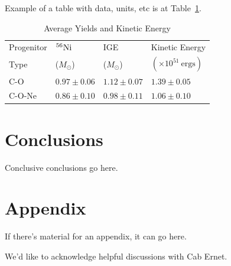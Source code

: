 \documentclass[iop,apj]{emulateapj}
\newcommand{\tabref}[1]{Table~\ref{#1}}
\newcommand{\Ni}[1]{\ensuremath{{}^{#1}{\rm Ni}}}
\newcommand{\unitstyle}[1]{\ensuremath{\mathrm{#1}}}
\newcommand{\erg}{\unitstyle{ergs}} %
\newcommand{\Msun}{\ensuremath{M_\odot}}
\begin{document}
Example of a table with data, units, etc is at \tabref{YieldSummaryTable}.

\begin{table}[htbp]
  \caption{Average Yields and Kinetic Energy}
  \begin{center}
    \begin{tabular}{llll}
      \vspace{-0.75cm} \\ \hline \hline
      Progenitor & \Ni{56} & IGE & Kinetic Energy \\
      Type & (\Msun) & (\Msun) & $\left(\times 10^{51} ~\erg\right)$ \\ \hline
      C-O & $0.97 \pm 0.06$ & $1.12 \pm 0.07$ & $1.39 \pm 0.05$ \\
      C-O-Ne & $0.86 \pm 0.10$ & $0.98 \pm 0.11$ & $1.06 \pm 0.10$ \\ \hline
    \end{tabular}
  \end{center}
  \label{YieldSummaryTable}
\end{table}



\section{Conclusions}
\label{sec:conclusions}

Conclusive conclusions go here.

\section{Appendix}

If there's material for an appendix, it can go here.

\acknowledgements

We'd like to acknowledge helpful discussions with Cab Ernet.



\end{document}
